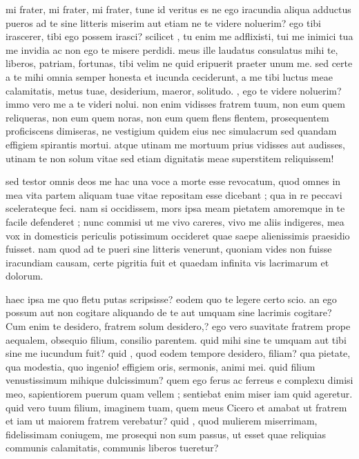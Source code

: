 


 mi frater, mi frater, mi frater, tune id veritus es ne ego iracundia aliqua adductus pueros ad te sine litteris miserim aut etiam ne te videre noluerim? ego tibi irascerer, tibi ego possem irasci? scilicet , tu enim me adflixisti, tui me inimici tua me invidia ac non ego te misere perdidi. meus ille laudatus consulatus mihi te, liberos, patriam, fortunas, tibi velim ne quid eripuerit praeter unum me. sed certe a te mihi omnia semper honesta et iucunda ceciderunt, a me tibi luctus meae calamitatis, metus tuae, desiderium, maeror, solitudo. , ego te videre noluerim? immo vero me a te videri nolui. non enim vidisses fratrem tuum, non eum quem reliqueras, non eum quem noras, non eum quem flens flentem, prosequentem proficiscens dimiseras, ne vestigium quidem eius nec simulacrum sed quandam effigiem spirantis mortui. atque utinam me mortuum prius vidisses aut audisses, utinam te non solum vitae sed etiam dignitatis meae superstitem reliquissem!

 sed testor omnis deos me hac una voce a morte esse revocatum, quod omnes in mea vita partem aliquam tuae vitae repositam esse dicebant ; qua in re peccavi scelerateque feci. nam si occidissem, mors ipsa meam pietatem amoremque in te facile defenderet ; nunc commisi ut me vivo careres, vivo me aliis indigeres, mea vox in domesticis periculis potissimum occideret quae saepe alienissimis praesidio fuisset. nam quod ad te pueri sine litteris venerunt, quoniam vides non fuisse iracundiam causam, certe pigritia fuit et quaedam infinita vis lacrimarum et dolorum.

 haec ipsa me quo fletu putas scripsisse? eodem quo te legere certo scio. an ego possum aut non cogitare aliquando de te aut umquam sine lacrimis cogitare? Cum enim te desidero, fratrem solum desidero,? ego vero suavitate fratrem prope aequalem, obsequio filium, consilio parentem. quid mihi sine te umquam aut tibi sine me iucundum fuit? quid , quod eodem tempore desidero, filiam? qua pietate, qua modestia, quo ingenio! effigiem oris, sermonis, animi mei. quid filium venustissimum mihique dulcissimum? quem ego ferus ac ferreus e complexu dimisi meo, sapientiorem puerum quam vellem ; sentiebat enim miser iam quid ageretur. quid vero tuum filium, imaginem tuam, quem meus Cicero et amabat ut fratrem et iam ut maiorem fratrem verebatur? quid , quod mulierem miserrimam, fidelissimam coniugem, me prosequi non sum passus, ut esset quae reliquias communis calamitatis, communis liberos tueretur?

